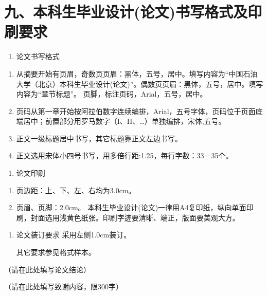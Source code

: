 \documentclass{cupb-thesis}
\begin{document}
\section{九、本科生毕业设计(论文)书写格式及印刷要求}

\begin{enumerate}[label=\arabic*.]
  \item 论文书写格式
\end{enumerate}
\begin{enumerate}[label=（\arabic*）]
  \item 从摘要开始有页眉，奇数页页眉：黑体，五号，居中。填写内容为“中国石油大学（北京）本科生毕业设计(论文)”。偶数页页眉：黑体，五号，居中。填写内容为“章节标题”。
页脚，标注页码，Arial，五号，居中。

  \item 页码从第一章开始按阿拉伯数字连续编排，Arial，五号字体，页码位于页面底端居中；前置部分用罗马数字（I、II、…）单独编排，宋体,五号。
  \item 正文一级标题居中书写，其它标题靠正文左边书写。
  \item 正文选用宋体小四号书写，用多倍行距:1.25，每行字数：33－35个。
\end{enumerate}
\begin{enumerate}[label=\arabic*.]
  \item 论文印刷
\end{enumerate}
\begin{enumerate}[label=（\arabic*）]
  \item 页边距：上、下、左、右均为3.0cm。
  \item 页眉、页脚：2.0cm。
本科生毕业设计(论文)一律用A4复印纸，纵向单面印刷，封面选用浅黄色纸张。印刷字迹要清晰、端正，版面要美观大方。

\end{enumerate}
\begin{enumerate}[label=\arabic*.]
  \item 论文装订要求
采用左侧1.0cm装订。

其它要求参见格式样本。


\end{enumerate}

\begin{conclusion}
（请在此处填写论文结论）
\end{conclusion}




\begin{acknowledgement}
（请在此处填写致谢内容，限300字）
\end{acknowledgement}
\end{document}
